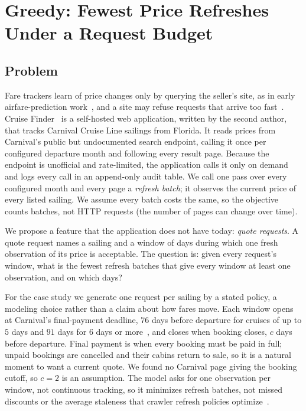 
\section{Greedy: Fewest Price Refreshes Under a Request Budget}
\label{sec:greedy}

\subsection{Problem}
\label{sec:greedy-problem}

Fare trackers learn of price changes only by querying the seller's site, as
in early airfare-prediction work~\cite{etzioni2003buy}, and a site may refuse
requests that arrive too fast~\cite{rfc6585}.
Cruise Finder~\cite{cruisefinder} is a self-hosted web application, written
by the second author, that tracks Carnival Cruise Line sailings from Florida.
It reads prices from Carnival's public but undocumented search endpoint,
calling it once per configured departure month and following every result
page. Because the endpoint is unofficial and rate-limited, the application
calls it only on demand and logs every call in an append-only audit table.
We call one pass over every configured month and every page a \emph{refresh
batch}; it observes the current price of every listed sailing. We assume
every batch costs the same, so the objective counts batches, not HTTP
requests (the number of pages can change over time).

We propose a feature that the application does not have today: \emph{quote
requests}. A quote request names a sailing and a window of days during which
one fresh observation of its price is acceptable. The question is: given every
request's window, what is the fewest refresh batches that give every window at
least one observation, and on which days?

For the case study we generate one request per sailing by a stated policy, a
modeling choice rather than a claim about how fares move. Each window opens at
Carnival's final-payment deadline, $76$ days before departure for cruises of
up to $5$ days and $91$ days for $6$ days or more~\cite{carnival481}, and
closes when booking closes, $c$ days before departure. Final payment is when
every booking must be paid in full; unpaid bookings are cancelled and their
cabins return to sale, so it is a natural moment to want a current quote. We
found no Carnival page giving the booking cutoff, so $c=2$ is an assumption.
The model asks for one observation per window, not continuous tracking, so it
minimizes refresh batches, not missed discounts or the average staleness that
crawler refresh policies optimize~\cite{cho2003refresh}.

